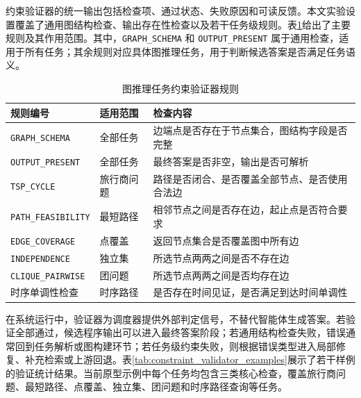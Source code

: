 约束验证器的统一输出包括检查项、通过状态、失败原因和可读反馈。本文实验设置覆盖了通用图结构检查、输出存在性检查以及若干任务级规则。表\ref{tab:constraint_validator_rules}给出了主要规则及其作用范围。其中，\texttt{GRAPH\_SCHEMA} 和 \texttt{OUTPUT\_PRESENT} 属于通用检查，适用于所有任务；其余规则对应具体图推理任务，用于判断候选答案是否满足任务语义。

\begin{table}[htbp]
\centering
\small
\caption{图推理任务约束验证器规则}
\label{tab:constraint_validator_rules}
\renewcommand{\arraystretch}{1.12}
\begin{tabularx}{\textwidth}{
>{\raggedright\arraybackslash}p{3.3cm}
>{\raggedright\arraybackslash}p{2.8cm}
>{\raggedright\arraybackslash}X}
\toprule
规则编号 & 适用范围 & 检查内容 \\
\midrule
\texttt{GRAPH\_SCHEMA} & 全部任务 & 边端点是否存在于节点集合，图结构字段是否完整 \\
\texttt{OUTPUT\_PRESENT} & 全部任务 & 最终答案是否非空，输出是否可解析 \\
\texttt{TSP\_CYCLE} & 旅行商问题 & 路径是否闭合、是否覆盖全部节点、是否使用合法边 \\
\texttt{PATH\_FEASIBILITY} & 最短路径 & 相邻节点之间是否存在边，起止点是否符合要求 \\
\texttt{EDGE\_COVERAGE} & 点覆盖 & 返回节点集合是否覆盖图中所有边 \\
\texttt{INDEPENDENCE} & 独立集 & 所选节点两两之间是否不存在边 \\
\texttt{CLIQUE\_PAIRWISE} & 团问题 & 所选节点两两之间是否均存在边 \\
时序单调性检查 & 时序路径 & 是否存在时间见证，是否满足到达时间单调性 \\
\bottomrule
\end{tabularx}
\end{table}

在系统运行中，验证器为调度器提供外部判定信号，不替代智能体生成答案。若验证全部通过，候选程序输出可以进入最终答案阶段；若通用结构检查失败，错误通常回到任务解析或图构建环节；若任务级约束失败，则根据错误类型进入局部修复、补充检索或上游回退。表\ref{tab:constraint_validator_examples}展示了若干样例的验证统计结果。当前原型示例中每个任务均包含三类核心检查，覆盖旅行商问题、最短路径、点覆盖、独立集、团问题和时序路径查询等任务。

